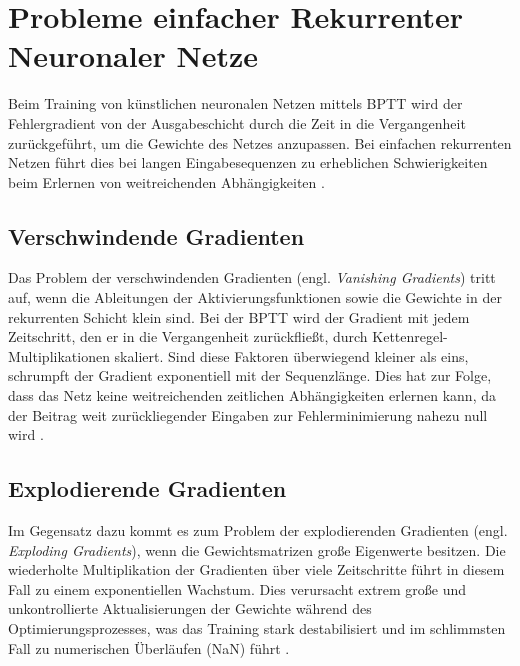 \chapter{Probleme einfacher Rekurrenter Neuronaler Netze}

Beim Training von künstlichen neuronalen Netzen mittels \ac{BPTT} wird der Fehlergradient von der Ausgabeschicht durch die Zeit in die Vergangenheit zurückgeführt, um die Gewichte des Netzes anzupassen. Bei einfachen rekurrenten Netzen führt dies bei langen Eingabesequenzen zu erheblichen Schwierigkeiten beim Erlernen von weitreichenden Abhängigkeiten \autocite{Bengio1994}.

\section{Verschwindende Gradienten}

Das Problem der verschwindenden Gradienten (engl. \textit{Vanishing Gradients}) tritt auf, wenn die Ableitungen der Aktivierungsfunktionen sowie die Gewichte in der rekurrenten Schicht klein sind. Bei der \ac{BPTT} wird der Gradient mit jedem Zeitschritt, den er in die Vergangenheit zurückfließt, durch Kettenregel-Multiplikationen skaliert. Sind diese Faktoren überwiegend kleiner als eins, schrumpft der Gradient exponentiell mit der Sequenzlänge. Dies hat zur Folge, dass das Netz keine weitreichenden zeitlichen Abhängigkeiten erlernen kann, da der Beitrag weit zurückliegender Eingaben zur Fehlerminimierung nahezu null wird \autocite{Hochreiter1991,Bengio1994}.

\section{Explodierende Gradienten}

Im Gegensatz dazu kommt es zum Problem der explodierenden Gradienten (engl. \textit{Exploding Gradients}), wenn die Gewichtsmatrizen große Eigenwerte besitzen. Die wiederholte Multiplikation der Gradienten über viele Zeitschritte führt in diesem Fall zu einem exponentiellen Wachstum. Dies verursacht extrem große und unkontrollierte Aktualisierungen der Gewichte während des Optimierungsprozesses, was das Training stark destabilisiert und im schlimmsten Fall zu numerischen Überläufen (\ac{NaN}) führt \autocite{Pascanu2013}.
